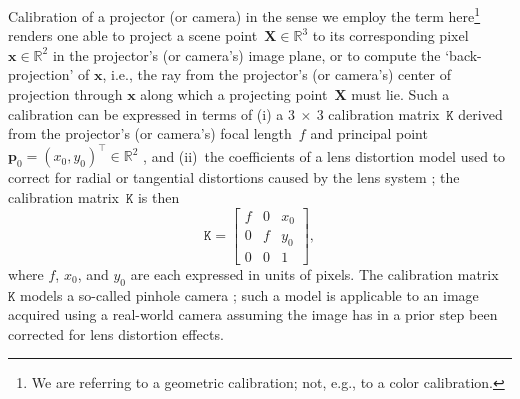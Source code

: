 \documentclass[review]{elsarticle}
\begin{document}
Calibration of a projector (or camera) in the sense we employ the term here\footnote{We are referring to a geometric calibration; not, e.g., to a color calibration.} renders one able to project a scene point~$\mathbf{X} \in \mathbb{R}^3$ to its corresponding pixel~$\mathbf{x} \in \mathbb{R}^2$ in the projector's (or camera's) image plane, or to compute the `back-projection' of $\mathbf{x}$, i.e., the ray from the projector's (or camera's) center of projection through $\mathbf{x}$ along which a projecting point~$\mathbf{X}$ must lie. Such a calibration can be expressed in terms of (i) a $3~\times{}~3$ calibration matrix~$\mathtt{K}$ derived from the projector's (or camera's) focal length~$f$ and principal point~$\mathbf{p}_0 = (x_0, y_0)^\top \in \mathbb{R}^2$ \cite{Hartley2004}, and (ii)~the coefficients of a lens distortion model used to correct for radial or tangential distortions caused by the lens system \cite{duane1971close,weng1992camera}; the calibration matrix~$\mathtt{K}$ is then
\begin{equation}
\mathtt{K} = \begin{bmatrix}
f & 0 & x_0 \\
0 & f & y_0 \\
0 & 0 & 1
\end{bmatrix},
\end{equation}
where $f$, $x_0$, and $y_0$ are each expressed in units of pixels. The calibration matrix~$\mathtt{K}$ models a so-called pinhole camera \cite{Hartley2004}; such a model is applicable to an image acquired using a real-world camera assuming the image has in a prior step been corrected for lens distortion effects. %
\end{document}
